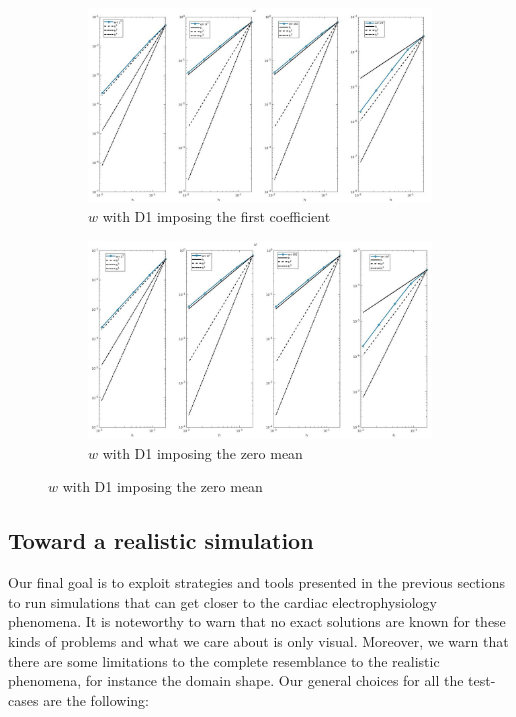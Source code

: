 \documentclass[a4paper,11pt]{article}
\begin{document}
\begin{figure}[H]
\caption{Comparison of the gating variable ($w$)}
\label{w-unique}
\begin{subfigure}{\textwidth}
\begin{center}
\includegraphics[width = \textwidth]{./D1_w_1.jpg}
\caption{$w$ with D1 imposing the first coefficient}
\end{center}
\end{subfigure}
\begin{subfigure}{\textwidth}
\begin{center}
\includegraphics[width =\textwidth]{./D1_w_2.jpg}
\caption{$w$ with D1 imposing the zero mean}
\end{center}
\end{subfigure}
\end{figure}
\restoregeometry
\newpage

\subsection{Toward a realistic simulation} \label{real_sim}
Our final goal is to exploit strategies and tools presented in the previous sections to run simulations that can get closer to the cardiac electrophysiology phenomena. It is noteworthy to warn that no exact solutions are known for these kinds of problems and what we care about is only visual. Moreover, we warn that there are some limitations to the complete resemblance to the realistic phenomena, for instance the domain shape. Our general choices for all the test-cases are the following:
\end{document}
